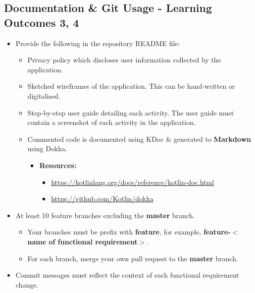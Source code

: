 \documentclass{article}
\begin{document}
\subsection*{Documentation \& Git Usage - Learning Outcomes 3, 4}
\begin{itemize}
    \item Provide the following in the repository README file:
    \begin{itemize}
        \item Privacy policy which discloses user information collected by the application.
        \item Sketched wireframes of the application. This can be hand-written or digitalised.
        \item Step-by-step user guide detailing each activity. The user guide must contain a screenshot of each activity in the application.
        \item Commented code is documented using KDoc \& generated to \textbf{Markdown} using Dokka.
        \begin{itemize}
            \item \textbf{Resources:}
            \begin{itemize}
                \item \footnotesize\href{https://kotlinlang.org/docs/reference/kotlin-doc.html}{https://kotlinlang.org/docs/reference/kotlin-doc.html}
                \item \footnotesize\href{https://github.com/Kotlin/dokka}{https://github.com/Kotlin/dokka}
            \end{itemize}
        \end{itemize} 
    \end{itemize}
    \item At least 10 feature branches excluding the \textbf{master} branch.
    \begin{itemize}
        \item Your branches must be prefix with \textbf{feature}, for example, \textbf{feature-$<$name of functional requirement$>$}.
        \item For each branch, merge your own pull request to the \textbf{master} branch.
    \end{itemize}
    \item Commit messages must reflect the context of each functional requirement change.
\end{itemize}
\end{document}
